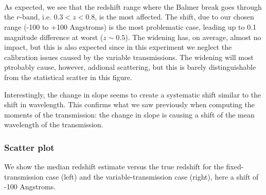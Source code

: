 \documentclass{article}
\begin{document}
    \begin{center}
    \end{center}
    { \hspace*{\fill} \\}
    
    \begin{center}
    \end{center}
    { \hspace*{\fill} \\}
    
    \begin{center}
    \end{center}
    { \hspace*{\fill} \\}
    
    As expected, we see that the redshift range where the Balmer break goes
through the \(r\)-band, i.e. \(0.3<z<0.8\), is the most affected. The
shift, due to our chosen range (-100 to +100 Angstroms) is the most
problematic case, leading up to 0.1 magnitude difference at worst
(\(z\sim0.5\)). The widening has, on average, almost no impact, but this
is also expected since in this experiment we neglect the calibration
issues caused by the variable transmissions. The widening will most
ptrobably cause, however, addional scattering, but this is barely
distinguishable from the statistical scatter in this figure.

Interestingly, the change in slope seems to create a systematic shift
similar to the shift in wavelength. This confirms what we saw previously
when computing the moments of the transmission: the change in slope is
causing a shift of the mean wavelength of the transmission.

\hypertarget{scatter-plot}{%
\subsubsection{Scatter plot}\label{scatter-plot}}

We show the median redshift estimate versus the true redshift for the
fixed-transmission case (left) and the variable-transmission case
(right), here a shift of -100 Angstroms.
\end{document}
